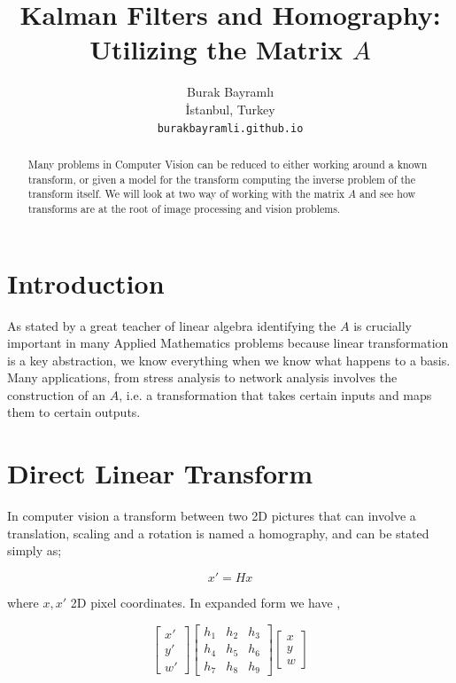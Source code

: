 \documentclass{article}
\title{Kalman Filters and Homography: Utilizing the Matrix $A$}
\author{
  Burak Bayramlı \\
  İstanbul, Turkey\\
  \texttt{burakbayramli.github.io} 
}
\begin{document}
\maketitle

\begin{abstract}
Many problems in Computer Vision can be reduced to either working around a known
transform, or given a model for the transform computing the inverse problem of
the transform itself. We will look at two way of working with the matrix $A$ and
see how transforms are at the root of image processing and vision problems.
\end{abstract}



\section{Introduction}

As stated by a great teacher of linear algebra identifying the $A$ is crucially
important in many Applied Mathematics problems \cite{strang} because linear
transformation is a key abstraction, we know everything when we know what
happens to a basis. Many applications, from stress analysis to network analysis
involves the construction of an $A$, i.e. a transformation that takes certain
inputs and maps them to certain outputs.

\section{Direct Linear Transform}

In computer vision a transform between two 2D pictures that can involve a
translation, scaling and a rotation is named a homography, and can be stated
simply as;

$$ x' = H x$$

where $x,x'$ 2D pixel coordinates. In expanded form we have \cite{solem},

$$ 
\left[\begin{array}{r} x' \\ y' \\ w' \end{array}\right]
\left[\begin{array}{rrr}
h_1 & h_2 & h_3 \\
h_4 & h_5 & h_6 \\
h_7 & h_8 & h_9 
\end{array}\right]
\left[\begin{array}{r} x \\ y \\ w \end{array}\right]
$$
\end{document}
